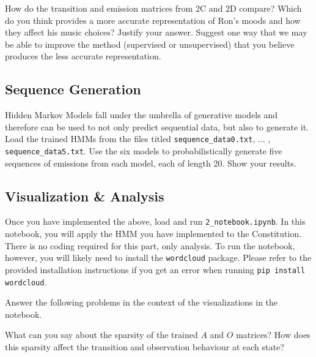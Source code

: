\problem[5] How do the transition and emission matrices from 2C and 2D compare? Which do you think provides a more accurate representation of Ron's moods and how they affect his music choices? Justify your answer. Suggest one way that we may be able to improve the method (supervised or unsupervised) that you believe produces the less accurate representation. 
\begin{subsolution}
	
\end{subsolution}
\newpage

\subsection{Sequence Generation}
Hidden Markov Models fall under the umbrella of generative models and therefore can be used to not only predict sequential data, but also to generate it. 
\problem[5] Load the trained HMMs from the files titled \texttt{sequence_data0.txt}, $\ldots$ , \texttt{sequence_data5.txt}. Use the six models to probabilistically generate five sequences of emissions from each model, each of length 20. Show your results. 
\begin{subsolution}
	
\end{subsolution}
\newpage

\subsection{Visualization \& Analysis}

Once you have implemented the above, load and run \texttt{2_notebook.ipynb}. In this notebook, you will apply the HMM you have implemented to the Constitution. There is no coding required for this part, only analysis. To run the notebook, however, you will likely need to install the \texttt{wordcloud} package. Please refer to the provided installation instructions if you get an error when running \texttt{pip install wordcloud}.

Answer the following problems in the context of the visualizations in the notebook.

\indent\problem[3] %
What can you say about the sparsity of the trained $A$ and $O$ matrices? How does this sparsity affect the transition and observation behaviour at each state?
\begin{subsolution}
	
\end{subsolution}
\newpage

